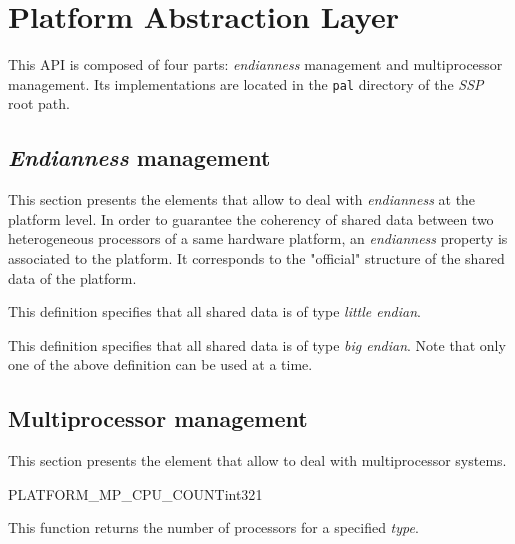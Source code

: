 \chapter {Platform Abstraction Layer}
This API is composed of four parts: \textit {endianness} management and
multiprocessor management. Its implementations are located in the
\texttt {pal} directory of the \textit {SSP} root path.
\skipon

\skipoff
\section {\textit {Endianness} management}
This section presents the elements that allow to deal with \textit
{endianness} at the platform level. In order to guarantee the coherency of
shared data between two heterogeneous processors of a same hardware platform, an
\textit {endianness} property is associated to the platform. It corresponds to
the "official" structure of the shared data of the platform.
\skipon


This definition specifies that all shared data is of type
\textit {little endian}.


This definition specifies that all shared data is of type
\textit {big endian}. Note that only one of the above definition
can be used at a time.

\skipoff
\section {Multiprocessor management}
This section presents the element that allow to deal with
multiprocessor systems.
\skipon

\begin{function}{PLATFORM\_MP\_CPU\_COUNT}{int32}{1}
\end{function}

This function returns the number of processors for a specified
\emph {type}.


